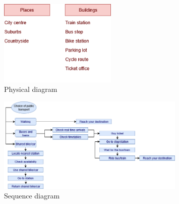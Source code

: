 \documentclass[11pt]{article}
\begin{document}
\begin{figure}[h!]
    \centering
    \includegraphics[width=0.5\textwidth]{drawable/diagrams/physical}
    \caption{Physical diagram}
    \label{fig:physical}
\end{figure}

\begin{figure}[h!]
    \centering
    \includegraphics[width=0.8\textwidth]{drawable/diagrams/sequence}
    \caption{Sequence diagram}
    \label{fig:sequence}
\end{figure}

\newpage\newpage
\end{document}
